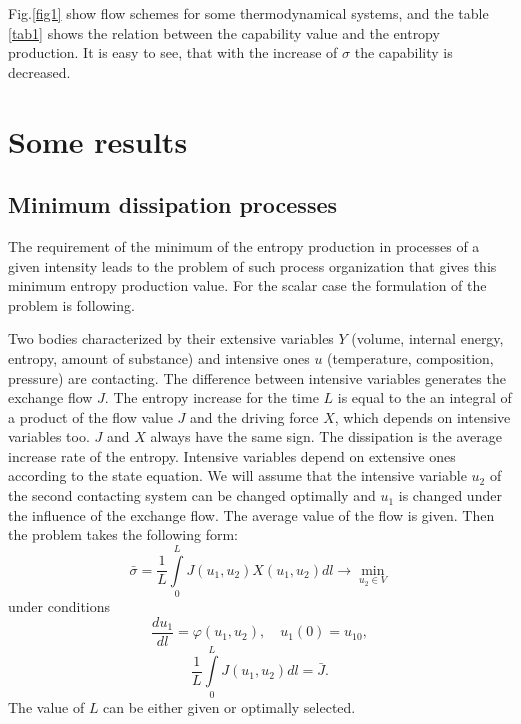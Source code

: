 \documentclass[epjST]{svjour}
\begin{document}
Fig.\ref{fig1} show flow schemes for some thermodynamical systems, and the table \ref{tab1} shows the relation between the capability value and the entropy production. It is easy to see, that with the increase of $\sigma$ the capability is decreased.

\section{Some results}

\subsection*{Minimum dissipation processes}

The requirement of the minimum of the entropy production in processes of a given intensity leads to the problem of such process organization that gives this minimum entropy production value. For the scalar case the formulation of the problem is following.

Two bodies characterized by their extensive variables $Y$ (volume, internal energy, entropy, amount of substance) and intensive ones $u$ (temperature, composition, pressure) are contacting. The difference between intensive variables generates the exchange flow $J$. The entropy increase for the time $L$ is equal to the an integral of a product of the flow value $J$ and the driving force $X$, which depends on intensive variables too. $J$ and $X$ always have the same sign. The dissipation is the average increase rate of the entropy. Intensive variables depend on extensive ones according to the state equation. We will assume that the intensive variable $u_2$ of the second contacting system can be changed optimally and $u_1$ is changed under the influence of the exchange flow. The average value of the flow is given. Then the problem takes the following form:
\begin{equation}
\bar{\sigma} = \frac{1}{L}\int\limits_0^L{J(u_1,u_2)X(u_1,u_2)dl} \rightarrow \min\limits_{u_2 \in V}
\label{MinDis}
\end{equation}
under conditions
\begin{equation}
\frac{du_1}{dl} = \varphi(u_1, u_2),\quad u_1(0) = u_{10},
\label{MinDisCond1}
\end{equation}
\begin{equation}
\frac{1}{L}\int\limits_0^L{J(u_1, u_2)dl} = \bar{J}.
\label{MinDisCond2}
\end{equation}
The value of $L$ can be either given or optimally selected.
\end{document}
